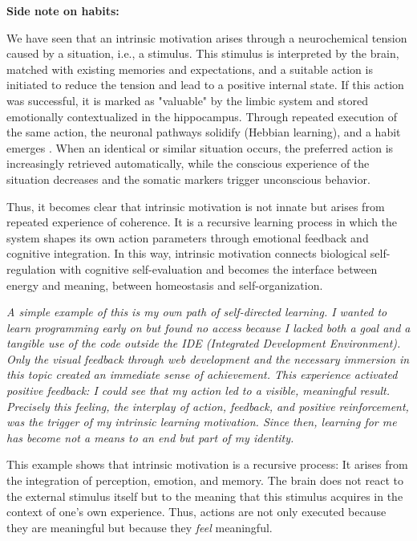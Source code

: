 \textbf{Side note on habits:}

We have seen that an intrinsic motivation arises through a neurochemical tension caused by a situation, i.e., a stimulus. This stimulus is interpreted by the brain, matched with existing memories and expectations, and a suitable action is initiated to reduce the tension and lead to a positive internal state.
If this action was successful, it is marked as "valuable" by the limbic system and stored emotionally contextualized in the hippocampus. Through repeated execution of the same action, the neuronal pathways solidify (Hebbian learning), and a habit emerges \cite{Hebb1949, Graybiel2008, YinKnowlton2006}.
When an identical or similar situation occurs, the preferred action is increasingly retrieved automatically, while the conscious experience of the situation decreases and the somatic markers trigger unconscious behavior.

Thus, it becomes clear that intrinsic motivation is not innate but arises from repeated experience of coherence. It is a recursive learning process in which the system shapes its own action parameters through emotional feedback and cognitive integration. In this way, intrinsic motivation connects biological self-regulation with cognitive self-evaluation and becomes the interface between energy and meaning, between homeostasis and self-organization.

\begin{reflexion}
\smallskip
\textit{A simple example of this is my own path of self-directed learning. I wanted to learn programming early on but found no access because I lacked both a goal and a tangible use of the code outside the IDE (Integrated Development Environment). Only the visual feedback through web development and the necessary immersion in this topic created an immediate sense of achievement. This experience activated positive feedback: I could see that my action led to a visible, meaningful result. Precisely this feeling, the interplay of action, feedback, and positive reinforcement, was the trigger of my intrinsic learning motivation. Since then, learning for me has become not a means to an end but part of my identity.}
\end{reflexion}

This example shows that intrinsic motivation is a recursive process: It arises from the integration of perception, emotion, and memory. The brain does not react to the external stimulus itself but to the meaning that this stimulus acquires in the context of one's own experience. Thus, actions are not only executed because they are meaningful but because they \emph{feel} meaningful.

